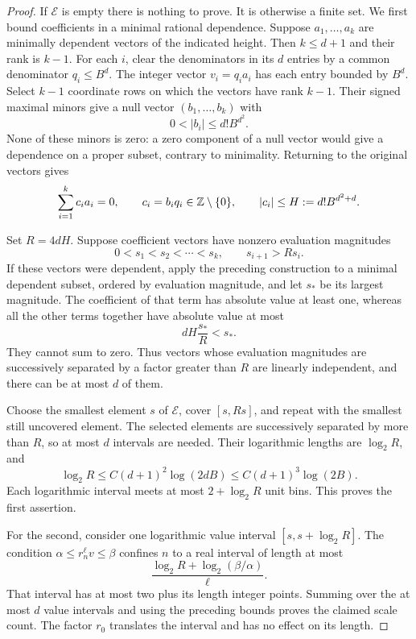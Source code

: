 \begin{proof}
If $\mathcal E$ is empty there is nothing to prove.  It is otherwise a
finite set.  We first bound coefficients in a minimal rational dependence.
Suppose $a_1,\ldots,a_k$ are minimally dependent vectors of the indicated
height.  Then $k\le d+1$ and their rank is $k-1$.  For each $i$, clear the
denominators in its $d$ entries by a common denominator $q_i\le B^d$.
The integer vector $v_i=q_i a_i$ has each entry bounded by $B^d$.  Select
$k-1$ coordinate rows on which the vectors have rank $k-1$.  Their signed
maximal minors give a null vector $(b_1,\ldots,b_k)$ with
\[
 0<|b_i|\le d! B^{d^2}.
\]
None of these minors is zero: a zero component of a null vector would give
a dependence on a proper subset, contrary to minimality.  Returning to
the original vectors gives
\[
 \sum_{i=1}^k c_i a_i=0,
 \qquad c_i=b_iq_i\in\mathbb Z\setminus\{0\},
 \qquad |c_i|\le H:=d! B^{d^2+d}.
\]

Set $R=4dH$.  Suppose coefficient vectors have nonzero evaluation magnitudes
\[
 0<s_1<s_2<\cdots<s_k,
 \qquad s_{i+1}>Rs_i.
\]
If these vectors were dependent, apply the preceding construction to a
minimal dependent subset, ordered by evaluation magnitude, and let $s_*$
be its largest magnitude.  The coefficient of that term has absolute value
at least one, whereas all the other terms together have absolute value at
most
\[
 dH\frac{s_*}{R}<s_*.
\]
They cannot sum to zero.  Thus vectors whose evaluation magnitudes are
successively separated by a factor greater than $R$ are linearly
independent, and there can be at most $d$ of them.

Choose the smallest element $s$ of $\mathcal E$, cover $[s,Rs]$, and repeat
with the smallest still uncovered element.  The selected elements are
successively separated by more than $R$, so at most $d$ intervals are
needed.  Their logarithmic lengths are $\log_2R$, and
\[
 \log_2R
    \le C(d+1)^2\log(2dB)
    \le C(d+1)^3\log(2B).
\]
Each logarithmic interval meets at most $2+\log_2R$ unit bins.  This proves
the first assertion.

For the second, consider one logarithmic value interval $[s,s+\log_2R]$.
The condition $\alpha\le r_n^\ell v\le\beta$ confines $n$ to a real
interval of length at most
\[
 \frac{\log_2R+\log_2(\beta/\alpha)}{\ell}.
\]
That interval has at most two plus its length integer points.  Summing over
the at most $d$ value intervals and using the preceding bounds proves the
claimed scale count.  The factor $r_0$ translates the interval and has no
effect on its length.


\end{proof}
